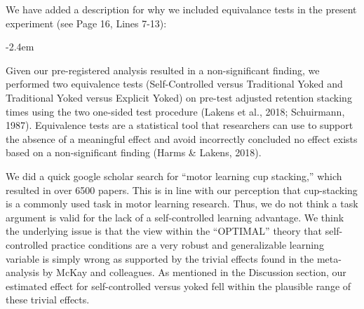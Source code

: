 \documentclass[final]{article}
\renewenvironment{quote}{\begin{fquote}\advance\leftmargini -2.4em\begin{oldquote}}{\end{oldquote}\end{fquote}}
\newenvironment{fquote}
  {\def\FrameCommand{
	\fboxsep=0.6em %
	\fcolorbox{black}{white}}%
    \MakeFramed {\advance\hsize-2\width \FrameRestore}
    \begin{minipage}{\linewidth}
  }
  {\end{minipage}\endMakeFramed}
\begin{document}

We have added a description for why we included equivalance tests in the present experiment (see Page 16, Lines 7-13):

\begin{quote}
Given our pre-registered analysis resulted in a non-significant finding, we performed two equivalence tests (Self-Controlled versus Traditional Yoked and Traditional Yoked versus Explicit Yoked) on pre-test adjusted retention stacking times using the two one-sided test procedure (Lakens et al., 2018; Schuirmann, 1987). Equivalence tests are a statistical tool that researchers can use to support the absence of a meaningful effect and avoid incorrectly concluded no effect exists based on a non-significant finding (Harms \& Lakens, 2018).
\end{quote}


We did a quick google scholar search for ``motor learning cup stacking,'' which resulted in over 6500 papers. This is in line with our perception that cup-stacking is a commonly used task in motor learning research. Thus, we do not think a task argument is valid for the lack of a self-controlled learning advantage. We think the underlying issue is that the view within the ``OPTIMAL'' theory that self-controlled practice conditions are a very robust and generalizable learning variable is simply wrong as supported by the trivial effects found in the meta-analysis by McKay and colleagues. As mentioned in the Discussion section, our estimated effect for self-controlled versus yoked fell within the plausible range of these trivial effects.
\end{document}
